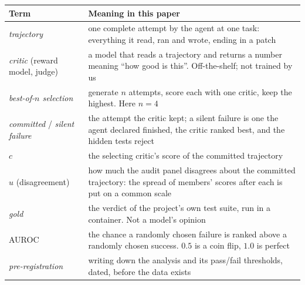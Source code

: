 \documentclass[11pt]{article}
\begin{document}
\bigskip
\begin{tabularx}{\linewidth}{@{}lX@{}}\toprule
Term & Meaning in this paper \\\midrule
\emph{trajectory} & one complete attempt by the agent at one task: everything it read, ran and wrote, ending in a patch \\
\emph{critic} (reward model, judge) & a model that reads a trajectory and returns a number meaning ``how good is this''. Off-the-shelf; not trained by us \\
\emph{best-of-$n$ selection} & generate $n$ attempts, score each with one critic, keep the highest. Here $n=4$ \\
\emph{committed} / \emph{silent failure} & the attempt the critic kept; a silent failure is one the agent declared finished, the critic ranked best, and the hidden tests reject \\
$c$ & the selecting critic's score of the committed trajectory \\
$u$ (disagreement) & how much the audit panel disagrees about the committed trajectory: the spread of members' scores after each is put on a common scale \\
\emph{gold} & the verdict of the project's own test suite, run in a container. Not a model's opinion \\
AUROC & the chance a randomly chosen failure is ranked above a randomly chosen success. $0.5$ is a coin flip, $1.0$ is perfect \\
\emph{pre-registration} & writing down the analysis and its pass/fail thresholds, dated, before the data exists \\\bottomrule
\end{tabularx}
\end{document}
